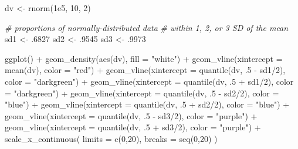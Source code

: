 \documentclass[
  oneside]{book}
\newenvironment{Shaded}{\begin{snugshade}}{\end{snugshade}}
\newcommand{\AttributeTok}[1]{\textcolor[rgb]{0.77,0.63,0.00}{#1}}
\newcommand{\CommentTok}[1]{\textcolor[rgb]{0.56,0.35,0.01}{\textit{#1}}}
\newcommand{\DecValTok}[1]{\textcolor[rgb]{0.00,0.00,0.81}{#1}}
\newcommand{\FloatTok}[1]{\textcolor[rgb]{0.00,0.00,0.81}{#1}}
\newcommand{\FunctionTok}[1]{\textcolor[rgb]{0.00,0.00,0.00}{#1}}
\newcommand{\NormalTok}[1]{#1}
\newcommand{\OtherTok}[1]{\textcolor[rgb]{0.56,0.35,0.01}{#1}}
\newcommand{\SpecialCharTok}[1]{\textcolor[rgb]{0.00,0.00,0.00}{#1}}
\newcommand{\StringTok}[1]{\textcolor[rgb]{0.31,0.60,0.02}{#1}}
\begin{document}
\begin{Shaded}
\begin{Highlighting}[]
\NormalTok{dv }\OtherTok{\textless{}{-}} \FunctionTok{rnorm}\NormalTok{(}\FloatTok{1e5}\NormalTok{, }\DecValTok{10}\NormalTok{, }\DecValTok{2}\NormalTok{)}

\CommentTok{\# proportions of normally{-}distributed data }
\CommentTok{\# within 1, 2, or 3 SD of the mean}
\NormalTok{sd1 }\OtherTok{\textless{}{-}}\NormalTok{ .}\DecValTok{6827} 
\NormalTok{sd2 }\OtherTok{\textless{}{-}}\NormalTok{ .}\DecValTok{9545}
\NormalTok{sd3 }\OtherTok{\textless{}{-}}\NormalTok{ .}\DecValTok{9973}

\FunctionTok{ggplot}\NormalTok{() }\SpecialCharTok{+}
  \FunctionTok{geom\_density}\NormalTok{(}\FunctionTok{aes}\NormalTok{(dv), }\AttributeTok{fill =} \StringTok{"white"}\NormalTok{) }\SpecialCharTok{+}
  \FunctionTok{geom\_vline}\NormalTok{(}\AttributeTok{xintercept =} \FunctionTok{mean}\NormalTok{(dv), }\AttributeTok{color =} \StringTok{"red"}\NormalTok{) }\SpecialCharTok{+}
  \FunctionTok{geom\_vline}\NormalTok{(}\AttributeTok{xintercept =} \FunctionTok{quantile}\NormalTok{(dv, .}\DecValTok{5} \SpecialCharTok{{-}}\NormalTok{ sd1}\SpecialCharTok{/}\DecValTok{2}\NormalTok{), }\AttributeTok{color =} \StringTok{"darkgreen"}\NormalTok{) }\SpecialCharTok{+}
  \FunctionTok{geom\_vline}\NormalTok{(}\AttributeTok{xintercept =} \FunctionTok{quantile}\NormalTok{(dv, .}\DecValTok{5} \SpecialCharTok{+}\NormalTok{ sd1}\SpecialCharTok{/}\DecValTok{2}\NormalTok{), }\AttributeTok{color =} \StringTok{"darkgreen"}\NormalTok{) }\SpecialCharTok{+}
  \FunctionTok{geom\_vline}\NormalTok{(}\AttributeTok{xintercept =} \FunctionTok{quantile}\NormalTok{(dv, .}\DecValTok{5} \SpecialCharTok{{-}}\NormalTok{ sd2}\SpecialCharTok{/}\DecValTok{2}\NormalTok{), }\AttributeTok{color =} \StringTok{"blue"}\NormalTok{) }\SpecialCharTok{+}
  \FunctionTok{geom\_vline}\NormalTok{(}\AttributeTok{xintercept =} \FunctionTok{quantile}\NormalTok{(dv, .}\DecValTok{5} \SpecialCharTok{+}\NormalTok{ sd2}\SpecialCharTok{/}\DecValTok{2}\NormalTok{), }\AttributeTok{color =} \StringTok{"blue"}\NormalTok{) }\SpecialCharTok{+}
  \FunctionTok{geom\_vline}\NormalTok{(}\AttributeTok{xintercept =} \FunctionTok{quantile}\NormalTok{(dv, .}\DecValTok{5} \SpecialCharTok{{-}}\NormalTok{ sd3}\SpecialCharTok{/}\DecValTok{2}\NormalTok{), }\AttributeTok{color =} \StringTok{"purple"}\NormalTok{) }\SpecialCharTok{+}
  \FunctionTok{geom\_vline}\NormalTok{(}\AttributeTok{xintercept =} \FunctionTok{quantile}\NormalTok{(dv, .}\DecValTok{5} \SpecialCharTok{+}\NormalTok{ sd3}\SpecialCharTok{/}\DecValTok{2}\NormalTok{), }\AttributeTok{color =} \StringTok{"purple"}\NormalTok{) }\SpecialCharTok{+}
  \FunctionTok{scale\_x\_continuous}\NormalTok{(}
    \AttributeTok{limits =} \FunctionTok{c}\NormalTok{(}\DecValTok{0}\NormalTok{,}\DecValTok{20}\NormalTok{), }
    \AttributeTok{breaks =} \FunctionTok{seq}\NormalTok{(}\DecValTok{0}\NormalTok{,}\DecValTok{20}\NormalTok{)}
\NormalTok{  )}
\end{Highlighting}
\end{Shaded}
\end{document}
